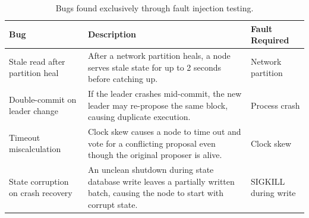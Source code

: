 \begin{table}[H]
\centering
\small
\begin{tabular}{@{}lp{7cm}l@{}}
\toprule
\textbf{Bug} & \textbf{Description} & \textbf{Fault Required} \\
\midrule
Stale read after partition heal & After a network partition heals, a node serves stale state for up to 2 seconds before catching up. & Network partition \\
Double-commit on leader change & If the leader crashes mid-commit, the new leader may re-propose the same block, causing duplicate execution. & Process crash \\
Timeout miscalculation & Clock skew causes a node to time out and vote for a conflicting proposal even though the original proposer is alive. & Clock skew \\
State corruption on crash recovery & An unclean shutdown during state database write leaves a partially written batch, causing the node to start with corrupt state. & SIGKILL during write \\
\bottomrule
\end{tabular}
\caption{Bugs found exclusively through fault injection testing.}
\end{table}

